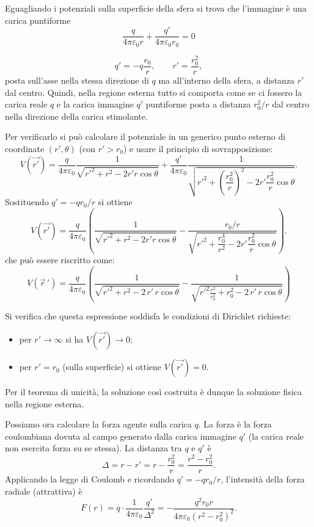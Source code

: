 \documentclass{book}
\begin{document}
Eguagliando i potenziali sulla superficie della sfera si trova che l'immagine è una carica puntiforme
$$
\frac{q}{4\pi\varepsilon_0 r} + \frac{q'}{4\pi\varepsilon_0 r_0}  = 0 
$$

\[
q'=-q\frac{r_0}{r},\qquad r'=\frac{r_0^2}{r},
\]
posta sull'asse nella stessa direzione di $q$ ma all'interno della sfera, a distanza $r'$ dal centro. Quindi, nella regione esterna tutto si comporta come se ci fossero la carica reale $q$ e la carica immagine $q'$ puntiforme posta a distanza $r_0^2/r$ dal centro nella direzione della carica stimolante.

Per verificarlo si può calcolare il potenziale in un generico punto esterno di coordinate $(r',\theta)$ (con $r'>r_0$) e usare il principio di sovrapposizione:
\[
V(\vec{ r'}) = \frac{q}{4\pi\varepsilon_0}\frac{1}{\sqrt{r'^{2}+r^{2}-2r'r\cos\theta}}
+\frac{q'}{4\pi\varepsilon_0}\frac{1}{\sqrt{r'^{2}+\left(\dfrac{r_0^{2}}{r}\right)^{2}-2r'\dfrac{r_0^{2}}{r}\cos\theta}}.
\]
Sostituendo $q'=-q r_0/r$ si ottiene
\[
V(\vec{ r'}) = \frac{q}{4\pi\varepsilon_0}\left(
\frac{1}{\sqrt{r'^{2}+r^{2}-2r'r\cos\theta}}
- \frac{r_0/r}{\sqrt{r'^{2}+\dfrac{r_0^{4}}{r^{2}}-2r'\dfrac{r_0^{2}}{r}\cos\theta}}
\right).
\]
che può essere riscritto come:
\[
V(\vec{r}\,') =
\frac{q}{4\pi\varepsilon_0}
\left(
\frac{1}{\sqrt{r'^{2} + r^{2} - 2\,r'\,r\cos\theta}}
-
\frac{1}{\sqrt{r'^{2}\frac{r^{2}}{r_0^{2}} + r_{0}^{2} - 2\,r'\,r\cos\theta}}
\right)
\]

Si verifica che questa espressione soddisfa le condizioni di Dirichlet richieste:
\begin{itemize}
  \item per $r'\to\infty$ si ha $V(\vec{r'})\to 0$;
  \item per $r'=r_0$ (sulla superficie) si ottiene $V(\vec{ r'})=0$.
\end{itemize}
Per il teorema di unicità, la soluzione così costruita è dunque la soluzione fisica nella regione esterna.

Possiamo ora calcolare la forza agente sulla carica $q$. La forza è la forza coulombiana dovuta al campo generato dalla carica immagine $q'$ (la carica reale non esercita forza su se stessa). La distanza tra $q$ e $q'$ è
\[
\Delta = r - r' = r - \frac{r_0^2}{r} = \frac{r^2-r_0^2}{r}.
\]
Applicando la legge di Coulomb e ricordando $q'=-q r_0/r$, l'intensità della forza radiale (attrattiva) è
\[
F(r) = q\cdot \frac{1}{4\pi\varepsilon_0}\frac{q'}{\Delta^{2}}
= -\frac{q^{2}r_{0}r}{4\pi\varepsilon_{0}(r^{2}-r_{0}^{2})^{2}}.
\]
\end{document}
